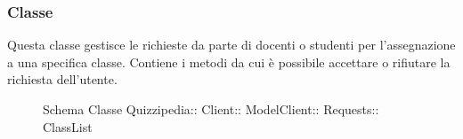 \subsubsection{Classe }
Questa classe gestisce le richieste da parte di docenti o studenti per l'assegnazione a una specifica classe. Contiene i metodi da cui è possibile accettare o rifiutare la richiesta dell'utente.
\begin{figure}[H]
\centering
\noindent{}
\caption[Schema Classe ClassList]{Schema Classe Quizzipedia:: Client:: ModelClient:: Requests:: ClassList}
\end{figure}
